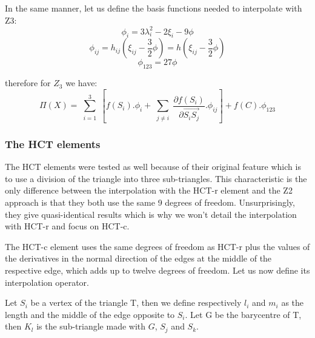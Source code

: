 \documentclass[proc]{edpsmath}
\begin{document}
\noindent In the same manner, let us define the basis functions needed to interpolate with Z3: 
\begin{equation*}
\phi_i = 3\lambda_{i}^2 -2 \xi_i - 9 \phi
\end{equation*}
\begin{equation*}
\phi_{ij} = h_{ij} (\xi_{ij} -\frac{3}{2}\phi)=h (\xi_{ij} -\frac{3}{2}\phi)
\end{equation*}
\begin{equation*}
\phi_{123}=27\phi
\end{equation*}

\noindent therefore for $Z_3$ we have:
\begin{equation*}
 \Pi (X) = \sum \limits_{\substack{i=1 }}^{3}{ [f(S_i).\phi_i + \sum \limits_{\substack{j\neq i }}^{}{ \frac{\partial f(S_i)}{\partial  \overrightarrow{ S_i S_j } }.\phi_{ij} } ] } + f(C).\phi_{123}
\end{equation*}

\subsubsection{The HCT elements}
The HCT elements were tested as well because of their original feature which is to use a division of the triangle into three sub-triangles.
This characteristic is the only difference between the interpolation with the HCT-r element and the  Z2 approach is that they both use the same 9 degrees of freedom. Unsurprisingly, they give quasi-identical results which is why we won't detail the interpolation with HCT-r and focus on HCT-c.

The HCT-c  element uses the same degrees of freedom as HCT-r plus the values of the derivatives in the normal direction of the edges at the middle of the respective edge, which adds up to twelve degrees of freedom. Let us now define its interpolation operator.

Let $S_i$ be a vertex of the triangle T, then we define respectively $l_i$ and $m_i$ as the length and the middle of the edge opposite to $S_i$. Let G be the barycentre of T, then $K_l$ is the sub-triangle made with $G$, $S_j$ and $S_k$.

\end{document}

